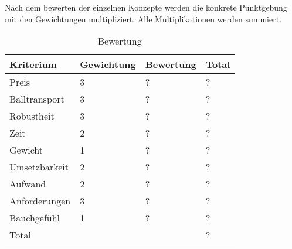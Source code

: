 Nach dem bewerten der einzelnen Konzepte werden die konkrete Punktgebung mit den Gewichtungen multipliziert. Alle Multiplikationen werden summiert.

\begin{table}[h!]
	\centering
	\begin{tabular}{l l l l}
		Kriterium & Gewichtung & Bewertung & Total \\
		\hline
		
		Preis & 3 & ? & ? \\
		Balltransport & 3 & ? & ? \\
		Robustheit & 3 & ? & ? \\
		Zeit & 2 & ? & ? \\
		Gewicht & 1 & ? & ? \\
		Umsetzbarkeit & 2 & ? & ? \\
		Aufwand & 2 & ? & ? \\
		Anforderungen & 3 & ? & ? \\
		Bauchgefühl & 1 & ? & ? \\
		Total &  &  & ? \\
	\end{tabular}
	\caption{Bewertung}
	\label{tab:quelle}
\end{table}